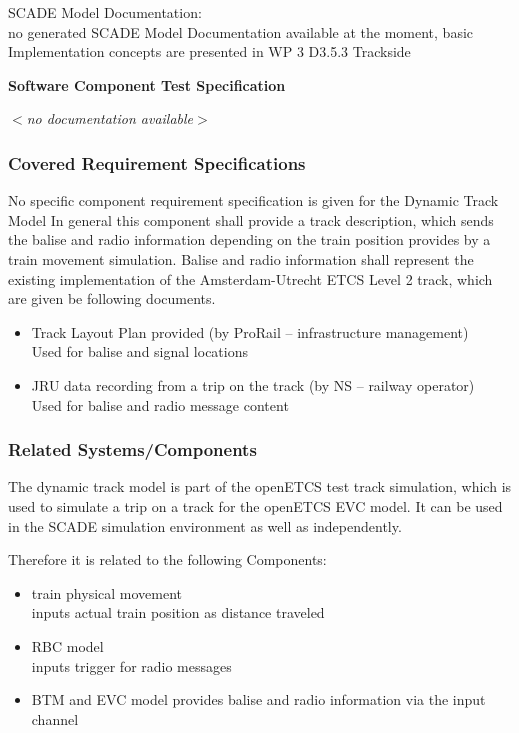 \documentclass{article}
\newcommand{\tbi}[1]{$<$\textit{#1}$>$}
\begin{document}
SCADE Model Documentation:\\

no generated SCADE Model Documentation available at the moment, basic Implementation concepts are presented in WP 3 D3.5.3 Trackside

\textbf{Software Component Test Specification}
 
 \tbi{no documentation available}
 
 
 \subsubsection*{Covered Requirement Specifications}

No specific component requirement specification is given for the Dynamic Track Model
In general this component shall provide a track description, which sends the balise and radio information depending on the train position provides by a train movement simulation. 
Balise and radio information shall represent the existing implementation of the Amsterdam-Utrecht ETCS Level 2 track, which are given be following documents.

\begin{itemize}
\item Track Layout Plan provided (by ProRail -- infrastructure management) \\
		Used for balise and signal locations
\item JRU data recording from a trip on the track (by NS -- railway operator)\\
		Used for balise and radio message content
\end{itemize}

\subsubsection*{Related Systems/Components} 
The dynamic track model is part of the openETCS test track simulation, which is used to simulate a trip on a track for the openETCS EVC model. It can be used in the SCADE simulation environment as well as independently. 

Therefore it is related to the following Components:
\begin{itemize}
\item train physical movement\\
		inputs actual train position as distance traveled
\item RBC model\\
		inputs trigger for radio messages
\item BTM and EVC model
		provides balise and radio information via the input channel 
\end{itemize} 
\end{document}
